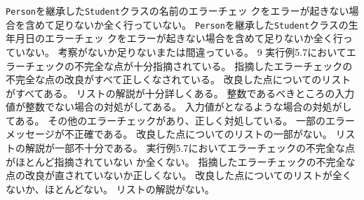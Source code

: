 {{ }
 {
 {\texttt{Person}を継承した\texttt{Student}クラスの名前のエラーチェッ
   クをエラーが起きない場合を含めて足りないか全く行っていない。}
 {\texttt{Person}を継承した\texttt{Student}クラスの生年月日のエラーチェッ
   クをエラーが起きない場合を含めて足りないか全く行っていない。}
 {考察がないか足りないまたは間違っている。}
 }
 {}{9}{
 {実行例5.7においてエラーチェックの不完全な点が十分指摘されている。}
 {指摘したエラーチェックの不完全な点の改良がすべて正しくなされている。}
 {改良した点についてのリストがすべてある。}
 {リストの解説が十分詳しくある。}
 }
 {
 {整数であるべきところの入力値が整数でない場合の対処がしてある。}
 {入力値がとなるような場合の対処がしてある。}
 {その他のエラーチェックがあり、正しく対処している。}
 {一部のエラーメッセージが不正確である。}
 {改良した点についてのリストの一部がない。}
 {リストの解説が一部不十分である。}
 }
 {
 {実行例5.7においてエラーチェックの不完全な点がほとんど指摘されていない
 か全くない。}
 {指摘したエラーチェックの不完全な点の改良が直されていないか正しくない。}
 {改良した点についてのリストが全くないか、ほとんどない。}
 {リストの解説がない。}
 }
 }